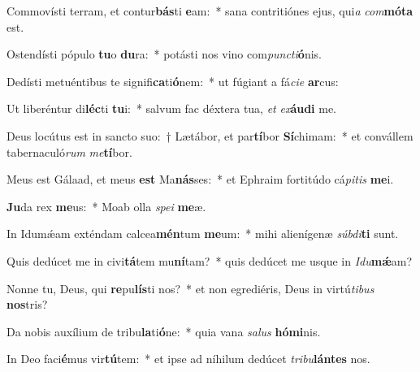 \item Commovísti terram, et contur\textbf{bás}ti \textbf{e}am:~* sana contritiónes ejus, qui\textit{a} \textit{com}\textbf{mó}\textbf{ta} est.
\item Ostendísti pópulo \textbf{tu}o \textbf{du}ra:~* potásti nos vino com\textit{punc}\textit{ti}\textbf{ó}nis.
\item Dedísti metuéntibus te signifi\textbf{ca}ti\textbf{ó}nem:~* ut fúgiant a fá\textit{ci}\textit{e} \textbf{ar}cus:
\item Ut liberéntur di\textbf{léc}ti \textbf{tu}i:~* salvum fac déxtera tua, \textit{et} \textit{ex}\textbf{áu}\textbf{di} me.
\item Deus locútus est in sancto suo:~† Lætábor, et par\textbf{tí}bor \textbf{Sí}chimam:~* et convállem tabernaculó\textit{rum} \textit{me}\textbf{tí}bor.
\item Meus est Gálaad, et meus \textbf{est} Ma\textbf{nás}ses:~* et Ephraim fortitúdo cá\textit{pi}\textit{tis} \textbf{me}i.
\item \textbf{Ju}da rex \textbf{me}us:~* Moab olla \textit{spe}\textit{i} \textbf{me}æ.
\item In Idumǽam exténdam calcea\textbf{mén}tum \textbf{me}um:~* mihi alienígenæ \textit{súb}\textit{di}\textbf{ti} sunt.
\item Quis dedúcet me in civi\textbf{tá}tem mu\textbf{ní}tam?~* quis dedúcet me usque in \textit{I}\textit{du}\textbf{mǽ}am?
\item Nonne tu, Deus, qui \textbf{re}pu\textbf{lís}ti nos?~* et non egrediéris, Deus in virtú\textit{ti}\textit{bus} \textbf{nos}tris?
\item Da nobis auxílium de tribu\textbf{la}ti\textbf{ó}ne:~* quia vana \textit{sa}\textit{lus} \textbf{hó}\textbf{mi}nis.
\item In Deo faci\textbf{é}mus vir\textbf{tú}tem:~* et ipse ad níhilum dedúcet \textit{tri}\textit{bu}\textbf{lán}\textbf{tes} nos.
